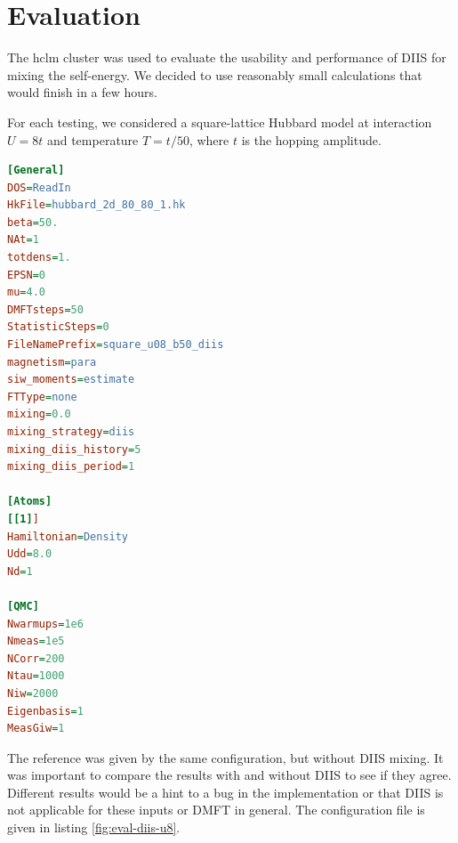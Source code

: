 \chapter{Evaluation}
\label{ch:evaluation}
The hclm cluster was used to evaluate the usability and performance of DIIS for mixing the self-energy. We decided to use reasonably small calculations that would finish in a few hours.

For each testing, we considered a square-lattice Hubbard model at interaction $U=8t$ and temperature $T=t/50$, where $t$ is the hopping amplitude.


\begin{lstlisting}[label=lst:w2dyn_config, language=ini, caption=The w2dynmaics configuration for this case]
[General]
DOS=ReadIn
HkFile=hubbard_2d_80_80_1.hk
beta=50.
NAt=1
totdens=1.
EPSN=0
mu=4.0
DMFTsteps=50
StatisticSteps=0
FileNamePrefix=square_u08_b50_diis
magnetism=para
siw_moments=estimate
FTType=none
mixing=0.0
mixing_strategy=diis
mixing_diis_history=5
mixing_diis_period=1

[Atoms]
[[1]]
Hamiltonian=Density
Udd=8.0
Nd=1

[QMC]
Nwarmups=1e6
Nmeas=1e5
NCorr=200
Ntau=1000
Niw=2000
Eigenbasis=1 
MeasGiw=1
\end{lstlisting}

The reference was given by the same configuration, but without DIIS mixing. It was important to compare the results with and without DIIS to see if they agree. Different results would be a hint to a bug in the implementation or that DIIS is not applicable for these inputs or DMFT in general. The configuration file is given in listing \ref{fig:eval-diis-u8}.

